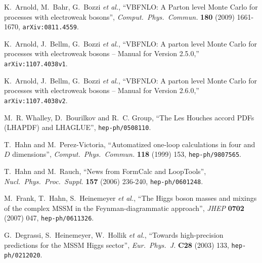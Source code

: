 \documentclass[english,12pt]{article}
\begin{document}

\newpage

%
%


\providecommand{\href}[2]{#2}\begingroup\begin{thebibliography}{10}

  K.~Arnold, M.~Bahr, G.~Bozzi {\it et al.},
  ``VBFNLO: A Parton level Monte Carlo for processes with electroweak bosons'',
  {\em Comput.\ Phys.\ Commun.}  {\bf 180 } (2009)  1661-1670, \href{http://arxiv.org/abs/0811.4559}{{\tt arXiv:0811.4559}}.

  K.~Arnold, J.~Bellm, G.~Bozzi {\it et al.},
  ``VBFNLO: A parton level Monte Carlo for processes with electroweak bosons -- Manual for Version 2.5.0,''
  \href{http://arxiv.org/abs/1107.4038v1}{{\tt arXiv:1107.4038v1}}.
  
  K.~Arnold, J.~Bellm, G.~Bozzi {\it et al.},
  ``VBFNLO: A parton level Monte Carlo for processes with electroweak bosons -- Manual for Version 2.6.0,''
  \href{http://arxiv.org/abs/1107.4038v2}{{\tt arXiv:1107.4038v2}}.
  
M.~R. Whalley, D.~Bourilkov and R.~C. Group, ``The Les Houches accord PDFs
(LHAPDF) and LHAGLUE'',
\href{http://www.arXiv.org/abs/hep-ph/0508110}{{\tt hep-ph/0508110}}.

  T.~Hahn and M.~Perez-Victoria,
  ``Automatized one-loop calculations in four and $D$ dimensions'',
  {\em Comput.\ Phys.\ Commun.}  {\bf 118} (1999) 153,
\href{http://www.arXiv.org/abs/hep-ph/9807565}{{\tt hep-ph/9807565}}.

  T.~Hahn and M.~Rauch,
  ``News from FormCalc and LoopTools'',
  {\em Nucl.\ Phys.\ Proc.\ Suppl.}  {\bf 157} (2006)  236-240,
\href{http://www.arXiv.org/abs/hep-ph/0601248}{{\tt hep-ph/0601248}}.

  M.~Frank, T.~Hahn, S.~Heinemeyer {\it et al.},
  ``The Higgs boson masses and mixings of the complex MSSM in the
  Feynman-diagrammatic approach'',
  {\em JHEP} {\bf 0702} (2007) 047,
\href{http://www.arXiv.org/abs/hep-ph/0611326}{{\tt hep-ph/0611326}}.

  G.~Degrassi, S.~Heinemeyer, W.~Hollik {\it et al.},
  ``Towards high-precision predictions for the MSSM Higgs sector'',
  {\em Eur.\ Phys.\ J.} {\bf C28} (2003) 133,
\href{http://www.arXiv.org/abs/hep-ph/0212020}{{\tt hep-ph/0212020}}.


\end{thebibliography}
\end{document}
